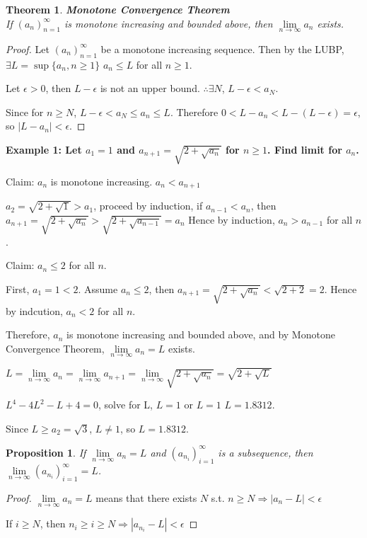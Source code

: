 \documentclass[12pt]{article}
\newcommand{\abs}[1]{\left| #1 \right|}
\theoremstyle{plain}
\newtheorem{theorem}{Theorem}[subsection]
\newtheorem{proposition}{Proposition}[subsection]
\newcommand{\dlim}{\displaystyle\lim\limits}
\begin{document}
    {\color{Blue}
    \begin{theorem}{\textbf{Monotone Convergence Theorem}}\\
        If $(a_n)_{n=1}^{\infty}$ is monotone increasing and bounded above, 
        then $\dlim_{n\to\infty} a_n$ exists.
    \end{theorem}

    \begin{proof}
        Let $(a_n)_{n=1}^\infty$ be a monotone increasing sequence. 
        Then by the LUBP, $\exists L = \sup \{a_n, n\geq 1\}$ $a_n\leq L$ for all $n\geq 1$.

        Let $\epsilon > 0$, then $L-\epsilon$ is not an upper bound. 
        $\therefore \exists N$, $L-\epsilon < a_N$.

        Since for $n\geq N$, $L-\epsilon < a_N\leq a_n \leq L$.
        Therefore $0<L-a_n<L-(L-\epsilon)=\epsilon$, so $\abs{L-a_n} < \epsilon$.
    \end{proof}}

    {\color{Brown}\textbf{Example 1: Let $a_1 = 1$ and $a_{n+1} = \sqrt{2+\sqrt {a_n}}$ for $n\geq 1$.
    Find limit for $a_n$.}

    Claim: $a_n$ is monotone increasing. $a_n<a_{n+1}$

    $a_2 = \sqrt {2+\sqrt 1} > a_1$, proceed by induction, 
    if $a_{n-1}<a_n$, then $a_{n+1} = \sqrt {2+\sqrt {a_n}}> \sqrt {2+\sqrt {a_{n-1}}}=a_n$
    Hence by induction, $a_n> a_{n-1}$ for all $n$.

    Claim: $a_n\leq 2$ for all $n$.
    
    First, $a_1=1<2$. Assume $a_n\leq 2$, 
    then $a_{n+1} = \sqrt {2+\sqrt {a_{n}}}<\sqrt {2+2}=2$. 
    Hence by indcution, $a_n<2$ for all $n$.

    Therefore, $a_n$ is monotone increasing and bounded above, 
    and by Monotone Convergence Theorem, $\dlim_{n\to\infty} a_n=L$ exists.
        
    $L = \dlim_{n\to\infty} a_n = \dlim_{n\to\infty} a_{n+1} 
    = \dlim_{n\to\infty} \sqrt{2+\sqrt{a_n}}=\sqrt{2+\sqrt L}$

    $L^4-4L^2-L+4=0$, solve for L, $L = 1$ or $L = 1$ $L = 1.8312$.

    Since $L \geq a_2=\sqrt 3$, $L\neq 1$, so $L=1.8312$.\\
    
    }

    \begin{proposition}
        If $\dlim_{n\to\infty} a_n=L$ and $(a_{n_i})_{i=1}^{\infty}$ is
        a subsequence, then $\dlim_{n\to\infty} (a_{n_i})_{i=1}^{\infty} = L$. 
    \end{proposition}
    \begin{proof}
        $\dlim_{n\to\infty} a_n= L$ means that there exists 
        $N$ s.t. $n\geq N \Rightarrow \abs{a_n-L} < \epsilon$

        If $i\geq N$, then $n_i\geq i \geq N \Rightarrow 
        \abs{a_{n_i}-L} < \epsilon$
        
    \end{proof}
\end{document}
